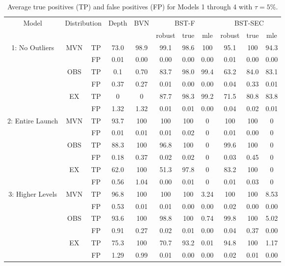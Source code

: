 \documentclass[12pt]{article}
\begin{document}
\begin{table}
\caption{Average true positives (TP) and false positives (FP) for Models 1 through 4 with $\tau=5\%$. }
\begin{center}
\begin{tabular}{c|cc|c|c|ccc|ccc}
\hline\hline
\multirow{2}{*}{ Model}&\multicolumn{2}{c|}{\multirow{2}{*}{Distribution}}& \multirow{2}{*}{Depth} &\multirow{2}{*}{ BVN }& \multicolumn{3}{c|}{BST-F} & \multicolumn{3}{c}{BST-SEC}\\
\cline{6-11}
&&&&&robust&true&mle&robust&true&mle\\
\hline
\multirow{6}{*}{1: No Outliers}&\multirow{2}{*}{MVN}&TP&  73.0 &98.9  &99.1& 98.6 &100&95.1&100&94.3 \\
	&&FP&0.01 & 0.00 &0.00 & 0.00&0.00&0.01&0.00&0.00\\
\cline{2-11}

&\multirow{2}{*}{OBS}&TP& 0.1 &0.70 &83.7&98.0&99.4&63.2& 84.0&83.1\\
&&FP & 0.37 &0.27 &0.01&0.00&0.00&0.04&0.33&0.01\\
\cline{2-11}
&\multirow{2}{*}{EX}&TP& 0 &0&87.7&98.3&99.2&71.5&80.8&83.8\\
&&FP&  1.32 &1.32&0.01&0.01&0.00&0.04&0.02&0.01\\

\hline
\multirow{6}{*}{2: Entire Launch}&\multirow{2}{*}{MVN}&TP& 93.7 &100 &100&100&0&100&100&0  \\
	&&FP& 0.01 &0.01 &0.01&0.02&0&0.01&0.00&0 \\
\cline{2-11}

&\multirow{2}{*}{OBS}&TP& 88.3 &100 &96.8&100&0&99.6&100&0\\
&&FP  & 0.18 &0.37&0.02&0.02&0&0.03&0.45&0\\
\cline{2-11}
&\multirow{2}{*}{EX}&TP & 62.0 &100&51.3&97.8&0&83.2&100&0\\
&&FP&  0.56 &1.04&0.00&0.01&0&0.01&0.03&0\\
\cline{1-11}




\multirow{6}{*}{3: Higher Levels}&\multirow{2}{*}{MVN}&TP& 96.8 &100&100&100&3.24&100&100&8.53 \\
	&&FP & 0.53 &0.01&0.01&0.00&0.00&0.02&0.00&0.00\\
\cline{2-11}

&\multirow{2}{*}{OBS}&TP& 93.6 &100&98.8&100&0.74&99.8&100&5.02\\
&&FP & 0.91 &0.27&0.02&0.01&0.00&0.04&0.37&0.00\\
\cline{2-11}
&\multirow{2}{*}{EX}&TP& 75.3 &100&70.7&93.2&0.01&94.8&100&1.17\\
&&FP&1.29 &0.99&0.01&0.00&0.00&0.02&0.01&0.00\\
\cline{1-11}




\end{tabular}
\end{center}
\end{table}
\end{document}
